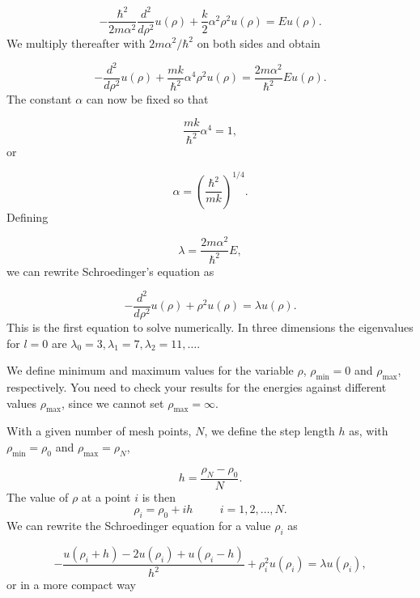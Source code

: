 \documentclass[%
oneside,                 %
final,                   %
10pt]{article}
\begin{document}
\begin{equation*}
  -\frac{\hbar^2}{2 m \alpha^2} \frac{d^2}{d\rho^2} u(\rho) 
       + \frac{k}{2} \alpha^2\rho^2u(\rho)  = E u(\rho) .
\end{equation*}
We multiply thereafter with $2m\alpha^2/\hbar^2$ on both sides and obtain

\begin{equation*}
  -\frac{d^2}{d\rho^2} u(\rho) 
       + \frac{mk}{\hbar^2} \alpha^4\rho^2u(\rho)  = \frac{2m\alpha^2}{\hbar^2}E u(\rho) .
\end{equation*}
The constant $\alpha$ can now be fixed
so that

\begin{equation*}
\frac{mk}{\hbar^2} \alpha^4 = 1,
\end{equation*}
or

\begin{equation*}
\alpha = \left(\frac{\hbar^2}{mk}\right)^{1/4}.
\end{equation*}
Defining

\begin{equation*}
\lambda = \frac{2m\alpha^2}{\hbar^2}E,
\end{equation*}
we can rewrite Schroedinger's equation as

\begin{equation*}
  -\frac{d^2}{d\rho^2} u(\rho) + \rho^2u(\rho)  = \lambda u(\rho) .
\end{equation*}
This is the first equation to solve numerically. In three dimensions 
the eigenvalues for $l=0$ are 
$\lambda_0=3,\lambda_1=7,\lambda_2=11,\dots .$

We define minimum and maximum values for the variable $\rho$,
$\rho_{\mathrm{min}}=0$  and $\rho_{\mathrm{max}}$, respectively.
You need to check your results for the energies against different values
$\rho_{\mathrm{max}}$, since we cannot set
$\rho_{\mathrm{max}}=\infty$. 

With a given number of mesh points, $N$, we 
define the step length $h$ as, with $\rho_{\mathrm{min}}=\rho_0$  and $\rho_{\mathrm{max}}=\rho_N$,

\begin{equation*}
  h=\frac{\rho_N-\rho_0 }{N}.
\end{equation*}
The value of $\rho$ at a point $i$ is then 
\[
    \rho_i= \rho_0 + ih \hspace{1cm} i=1,2,\dots , N.
\]
We can rewrite the Schroedinger equation for a value $\rho_i$ as

\[
-\frac{u(\rho_i+h) -2u(\rho_i) +u(\rho_i-h)}{h^2}+\rho_i^2u(\rho_i)  = \lambda u(\rho_i),
\]
or in  a more compact way
\end{document}
